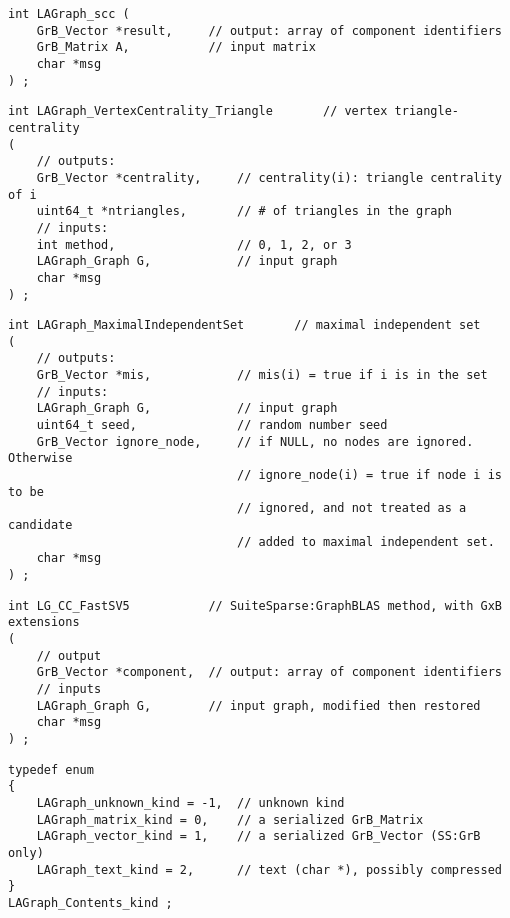\begin{verbatim}
int LAGraph_scc (
    GrB_Vector *result,     // output: array of component identifiers
    GrB_Matrix A,           // input matrix
    char *msg
) ;
\end{verbatim}




\begin{verbatim}
int LAGraph_VertexCentrality_Triangle       // vertex triangle-centrality
(
    // outputs:
    GrB_Vector *centrality,     // centrality(i): triangle centrality of i
    uint64_t *ntriangles,       // # of triangles in the graph
    // inputs:
    int method,                 // 0, 1, 2, or 3
    LAGraph_Graph G,            // input graph
    char *msg
) ;
\end{verbatim}




\begin{verbatim}
int LAGraph_MaximalIndependentSet       // maximal independent set
(
    // outputs:
    GrB_Vector *mis,            // mis(i) = true if i is in the set
    // inputs:
    LAGraph_Graph G,            // input graph
    uint64_t seed,              // random number seed
    GrB_Vector ignore_node,     // if NULL, no nodes are ignored.  Otherwise
                                // ignore_node(i) = true if node i is to be
                                // ignored, and not treated as a candidate
                                // added to maximal independent set.
    char *msg
) ;
\end{verbatim}




\begin{verbatim}
int LG_CC_FastSV5           // SuiteSparse:GraphBLAS method, with GxB extensions
(
    // output
    GrB_Vector *component,  // output: array of component identifiers
    // inputs
    LAGraph_Graph G,        // input graph, modified then restored
    char *msg
) ;
\end{verbatim}




\begin{verbatim}
typedef enum
{
    LAGraph_unknown_kind = -1,  // unknown kind
    LAGraph_matrix_kind = 0,    // a serialized GrB_Matrix
    LAGraph_vector_kind = 1,    // a serialized GrB_Vector (SS:GrB only)
    LAGraph_text_kind = 2,      // text (char *), possibly compressed
}
LAGraph_Contents_kind ;
\end{verbatim}




